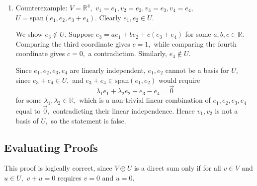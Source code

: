 \documentclass[12pt]{article}
\begin{document}
\begin{enumerate}
    It remains to show that $\operatorname{span}(B) = V.$ We show
    that every $B'_i \in B'$ lies in $\operatorname{span}(B)$ by
    induction on $i.$ Suppose that
    $$
    B'_1, \ldots, B'_{i-1} \in \operatorname{span}(B).
    $$
    If $B'_i \in B$, then clearly $B'_i \in \operatorname{span}(B).$
    Otherwise, by the definition of $B$,
    $$
    B'_i \in \operatorname{span}(B'_1, \ldots, B'_{i-1}).
    $$
    By the induction hypothesis, each $B'_1, \ldots, B'_{i-1}$ lies
    in $\operatorname{span}(B)$, and therefore
    $$
    B'_i \in \operatorname{span}(B).
    $$
    Thus, every element of $B'$ lies in $\operatorname{span}(B)$, so
    $$
    \operatorname{span}(B') \subseteq \operatorname{span}(B).
    $$
    Since $B \subseteq B'$, we also have
    $$
    \operatorname{span}(B) \subseteq \operatorname{span}(B').
    $$
    Therefore,
    $$
    \operatorname{span}(B) = \operatorname{span}(B') = V.
    $$
    Hence, $B$ is a basis of $V.$ Finally, since
    $$
    B \subseteq B' \subseteq U \cup W,
    $$
    every element of $B$ lies in $U \cup W.$

  \item Counterexample: $V = \mathbb R^{4},$ $v_1 = e_1, v_2 = e_2,
    v_3 = e_3, v_4 = e_4,$ $U = \text{span}(e_1, e_2, e_3 + e_4).$
    Clearly $e_1, e_2 \in U.$

    We show $e_3 \notin U.$ Suppose $e_3 = a e_1 + b e_2 + c(e_3 +
    e_4)$ for some $a, b, c \in \mathbb R.$ Comparing the third
    coordinate gives $c = 1,$ while comparing the fourth coordinate
    gives $c = 0,$ a contradiction. Similarly, $e_4 \notin U.$

    Since $e_1, e_2, e_3, e_4$ are linearly independent, $e_1, e_2$
    cannot be a basis for $U,$ since $e_3 + e_4 \in U,$ and $e_3 +
    e_4 \in \text{span}(e_1, e_2)$ would require
    $$
    \lambda_1 e_1 + \lambda_2 e_2 - e_3 - e_4 = \vec 0
    $$
    for some $\lambda_1, \lambda_2 \in \mathbb R,$ which is a
    non-trivial linear combination of $e_1, e_2, e_3, e_4$ equal to
    $\vec 0,$ contradicting their linear independence. Hence $v_1,
    v_2$ is not a basis of $U,$ so the statement is false.
\end{enumerate}

\subsection{Evaluating Proofs}
This proof is logically correct, since $V \oplus U$ is a direct sum
only if for all $v \in V$ and $u \in U,$  $v + u = 0$ requires $v =
0$ and $u = 0.$
\end{document}
